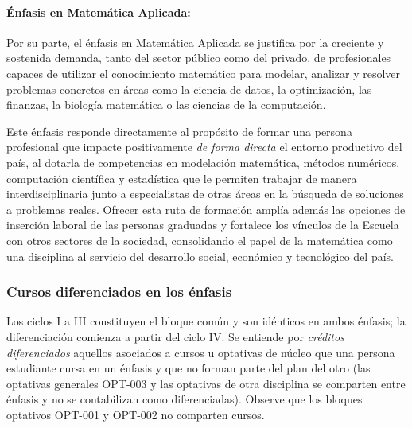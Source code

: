 \begin{refsection}
\paragraph{Énfasis en Matemática Aplicada:}

Por su parte, el énfasis en Matemática Aplicada se justifica por la creciente y sostenida demanda, tanto del sector público como del privado, de profesionales capaces de utilizar el conocimiento matemático para modelar, analizar y resolver problemas concretos en áreas como la ciencia de datos, la optimización, las finanzas, la biología matemática o las ciencias de la computación. 

Este énfasis responde directamente al propósito de formar una persona profesional que impacte positivamente \textit{de forma directa} el entorno productivo del país, al dotarla de competencias en modelación matemática, métodos numéricos, computación científica y estadística que le permiten trabajar de manera interdisciplinaria junto a especialistas de otras áreas en la búsqueda de soluciones a problemas reales. Ofrecer esta ruta de formación amplía además las opciones de inserción laboral de las personas graduadas y fortalece los vínculos de la Escuela con otros sectores de la sociedad, consolidando el papel de la matemática como una disciplina al servicio del desarrollo social, económico y tecnológico del país.

\subsubsection{Cursos diferenciados en los énfasis}

Los ciclos I a III constituyen el bloque común y son idénticos en ambos énfasis; la diferenciación comienza a partir del ciclo IV. Se entiende por \emph{créditos diferenciados} aquellos asociados a cursos u optativas de núcleo que una persona estudiante cursa en un énfasis y que no forman parte del plan del otro (las optativas generales OPT-003 y las optativas de otra disciplina se comparten entre énfasis y no se contabilizan como diferenciadas). Observe que los bloques optativos OPT-001 y OPT-002 no comparten cursos.


\end{refsection}
